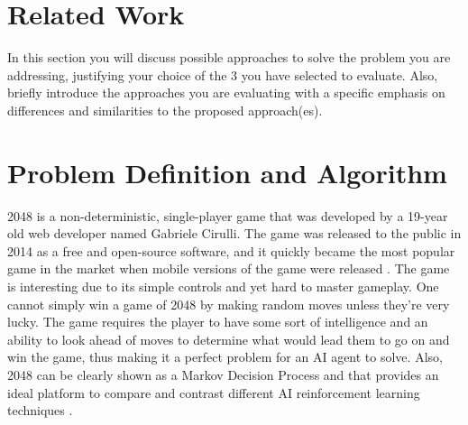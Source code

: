 \documentclass{svproc}
\begin{document}
    \section{Related Work}
    In this section you will discuss possible approaches to solve the problem you are addressing, justifying your choice of the 3 you have selected to evaluate. Also, briefly introduce the approaches you are evaluating with a specific emphasis on differences and similarities to the proposed approach(es).

    \section{Problem Definition and Algorithm}
   
	 
	2048 is a non-deterministic, single-player game that was developed by a 19-year old web developer named Gabriele Cirulli. The game was released to the public in 2014 as a free and open-source software, and it quickly became the most popular game in the market when mobile versions of the game were released \cite{wiki_2048}. The game is interesting due to its simple controls and yet hard to master gameplay. One cannot simply win a game of 2048 by making random moves unless they’re very lucky. The game requires the player to have some sort of intelligence and an ability to look ahead of moves to determine what would lead them to go on and win the game, thus making it a perfect problem for an AI agent to solve. Also, 2048 can be clearly shown as a Markov Decision Process and that provides an ideal platform to compare and contrast different AI reinforcement learning techniques \cite{jaskowski, pedagogy}.
\end{document}
